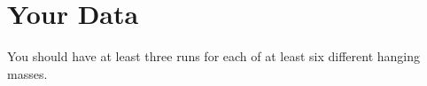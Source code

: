 \section{Your Data}
%
You should have at least three runs for each of at least six different hanging masses.
%
%
